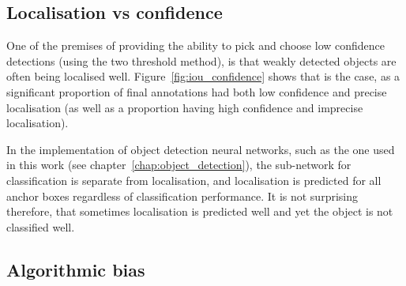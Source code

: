 \subsection{Localisation vs confidence}
\label{sec:localisation_confidence}

One of the premises of providing the ability to pick and choose low confidence detections (using the two threshold method), is that weakly detected objects are often being localised well. Figure~\ref{fig:iou_confidence} shows that is the case, as a significant proportion of final annotations had both low confidence and  precise localisation (as well as a proportion having high confidence and imprecise localisation).


\begin{table}[h]
\caption{Breakdown by dataset of detections included as an annotation; confident if $ p > 0.7 $, precise if $ IoU > 0.85 $ with respect to final annotation} 
    \centering
\noindent{}
\label{tab:confidence_precision}
\end{table}

In the implementation of object detection neural networks, such as the one used in this work (see chapter~\ref{chap:object_detection}), the sub-network for classification is separate from localisation, and localisation is predicted for all anchor boxes regardless of classification performance. It is not surprising therefore, that sometimes localisation is predicted well and yet the object is not classified well.



\subsection{Algorithmic bias}
\label{sec:machine_bias}

